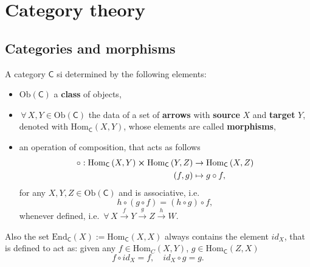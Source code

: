 \section{Category theory}

\subsection{Categories and morphisms}

\begin{defn}[Category]
	A category $\mathsf{C}$ si determined by the following elements:
	\begin{itemize}
		\item $\mathrm{Ob}(\mathsf{C})$ a \textbf{class} of objects,
		\item $\,\forall\, X,Y \in \mathrm{Ob}(\mathsf{C})$ the data of a set of \textbf{arrows}  with \textbf{source} $X$ and \textbf{target} $Y$, denoted with $\mathrm{Hom}_{\mathsf{C}} \left( X, Y \right)$, whose elements are called \textbf{morphisms},
		\item an operation of composition, that acts as follows
			\begin{align}
				\circ: \mathrm{Hom}_{\mathsf{C}} \left( X, Y \right) \cross \mathrm{Hom}_{\mathsf{C}} \left( Y, Z \right) &\to \mathrm{Hom}_{\mathsf{C}} \left( X, Z \right)\\
				\left(f, g\right) &\mapsto g \circ f
			,\end{align} 
			for any $X,Y,Z \in \mathrm{Ob}(\mathsf{C})$ and is associative, i.e.
			\begin{equation}
				h \circ (g \circ f) = (h \circ g) \circ f
			,\end{equation} 
			whenever defined, i.e. $\,\forall\, X \xrightarrow{f} Y \xrightarrow{g} Z \xrightarrow{h} W$.
	\end{itemize}
	Also the set $\mathrm{End}_{\mathsf{C}}\left(X\right) := \mathrm{Hom}_{\mathsf{C}} \left( X, X \right)$ always contains the element $id_X$, that is defined to act as: given any $f \in \mathrm{Hom}_{C} \left( X, Y \right)$, $g \in \mathrm{Hom}_{\mathsf{C}} \left( Z, X \right)$ 
	\begin{equation}
	f \circ id_X = f, \quad id_X \circ g = g
	.\end{equation} 
\end{defn}

